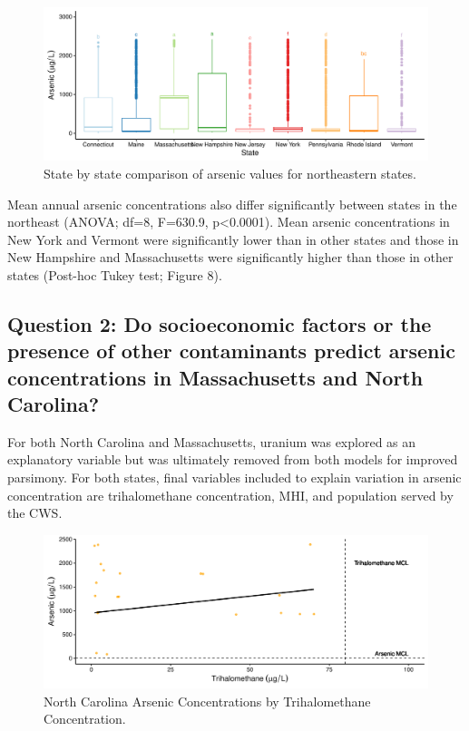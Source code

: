 \documentclass[12pt,]{article}
\begin{document}
\newpage

\begin{figure}
\centering
\includegraphics{Project_Template_files/figure-latex/figs8-1.pdf}
\caption{State by state comparison of arsenic values for northeastern
states.}
\end{figure}

Mean annual arsenic concentrations also differ significantly between
states in the northeast (ANOVA; df=8, F=630.9, p\textless{}0.0001). Mean
arsenic concentrations in New York and Vermont were significantly lower
than in other states and those in New Hampshire and Massachusetts were
significantly higher than those in other states (Post-hoc Tukey test;
Figure 8).

\newpage

\hypertarget{question-2-do-socioeconomic-factors-or-the-presence-of-other-contaminants-predict-arsenic-concentrations-in-massachusetts-and-north-carolina}{%
\subsection{Question 2: Do socioeconomic factors or the presence of
other contaminants predict arsenic concentrations in Massachusetts and
North
Carolina?}\label{question-2-do-socioeconomic-factors-or-the-presence-of-other-contaminants-predict-arsenic-concentrations-in-massachusetts-and-north-carolina}}

For both North Carolina and Massachusetts, uranium was explored as an
explanatory variable but was ultimately removed from both models for
improved parsimony. For both states, final variables included to explain
variation in arsenic concentration are trihalomethane concentration,
MHI, and population served by the CWS.

\begin{figure}
\centering
\includegraphics{Project_Template_files/figure-latex/figs9-1.pdf}
\caption{North Carolina Arsenic Concentrations by Trihalomethane
Concentration.}
\end{figure}
\end{document}
